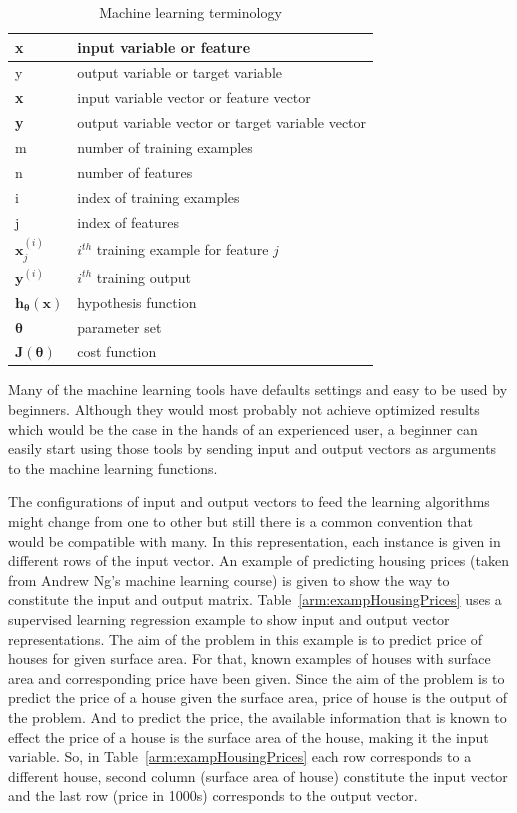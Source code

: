 \begin{table}
\caption{Machine learning terminology}
\label{arm:machineLearningTerminology}
\begin{center}
\begin{tabular}{||l|l||}\hline
x & input variable or feature \\\hline
y & output variable or target variable \\\hline
\textbf{x} & input variable vector or feature vector \\\hline
\textbf{y} & output variable vector or target variable vector \\\hline
m & number of training examples \\\hline
n & number of features \\\hline
i & index of training examples \\\hline
j & index of features \\\hline
$\textbf{x}_j^{(i)}$ & $i^{th}$ training example for feature $j$ \\\hline
$\textbf{y}^{(i)}$ & $i^{th}$ training output  \\\hline
$\textbf{h}_{\bm{\theta}}(\textbf{x})$ &hypothesis function\\\hline
$\bm{\theta}$ &parameter set\\\hline
$\textbf{J}({\bm{\theta}})$ &cost function  \\\hline

\end{tabular}
\end{center}
\end{table}

Many of the machine learning tools have defaults settings and easy to be used by beginners. 
Although they would most probably not achieve optimized results which would be the case in the hands of an experienced user, a beginner can easily start using those tools by sending input and output vectors as arguments to the machine learning functions. 

The configurations of input and output vectors to feed the learning algorithms might change from one to other but still there is a common convention that would be compatible with many. 
In this representation, each instance is given in different rows of the input vector. 
An example of predicting housing prices (taken from Andrew Ng's machine learning course) is given to show the way to constitute the input and output matrix. 
Table~\ref{arm:exampHousingPrices} uses a supervised learning regression example to show input and output vector representations. 
The aim of the problem in this example is to predict price of houses for given surface area. 
For that, known examples of houses with surface area and corresponding price have been given. 
Since the aim of the problem is to predict the price of a house given the surface area, price of house is the output of the problem. 
And to predict the price, the available information that is known to effect the price of a house is the surface area of the house, making it the input variable. 
So, in Table~\ref{arm:exampHousingPrices} each row corresponds to a different house, second column (surface area of house) constitute the input vector and the last row (price in 1000s) corresponds to the output vector. 

